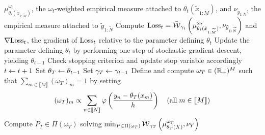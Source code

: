 \begin{algorithm}[h]
\begin{algorithmic}
    $\mu_{\theta_{t}(\tilde{x}_{1:\widetilde{M}})}^{\omega_{t}}$,          the
    $\omega_{t}$-weighted       empirical       measure      attached       to
    $\theta_{t}(\tilde{x}_{1:\widetilde{M}})$,                             and
    $\nu_{\tilde{y}_{1:\widetilde{N}}}$,  the  empirical measure  attached  to
    $\tilde{y}_{1:\widetilde{N}}$
    \STATE                                                             Compute
    $\text{Loss}_{t}                                                               =
    \bar{\operatorname{\mathcal{W}}}_{\gamma_{t}}\left(\mu^{\omega_{t}}_{\theta_{t}(\tilde{x}_{1:\widetilde{M}})},
      \nu_{\tilde{y}_{1:\widetilde{N}}} \right)$  and $\nabla  \text{Loss}_{t}$, the
    gradient of  $\text{Loss}_{t}$ relative  to the parameter  defining $\theta_{t}$
    \STATE Update the  parameter defining $\theta_{t}$ by  performing one step
    of stochastic gradient descent, yielding $\theta_{t+1}$
    \STATE Check stopping criterion and update stop variable accordingly
    \STATE $t \leftarrow t+1$
    \ENDWHILE
    \STATE Set $\theta_{T} \leftarrow \theta_{t-1}$
    \STATE Set $\gamma_{T} \leftarrow \gamma_{t-1}$
    \STATE  Define  and  compute  $\omega_{T} \in  (\mathbb{R}_{+})^{M}$  such  that
    $\sum_{m \in \llbracket M\rrbracket} (\omega_{T})_{m} = 1$ by setting
    \begin{equation*}
      (\omega_{T})_{m} \propto \sum_{n \in \llbracket N\rrbracket}
      \varphi\left(\frac{y_{n}    -   \theta_{T}(x_{m})}{h}\right)
      \quad (\text{all\;} m\in \llbracket M\rrbracket) 
    \end{equation*}
    \STATE    Compute    $\tilde{P}_{T}     \in    \Pi(\omega_{T})$    solving
    $\min_{P                        \in                       \Pi(\omega_{T})}
    \operatorname{\mathcal{W}}_{\gamma_{T}}\left(\mu^{\omega_{T}}_{\theta_{T}(X)}, \nu_{Y} \right)$
\end{algorithmic}
\end{algorithm}






